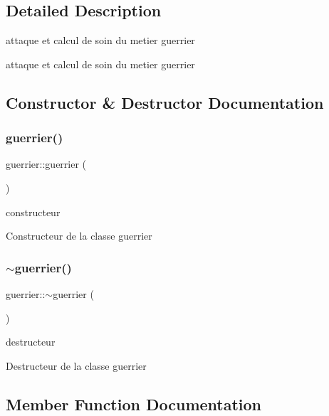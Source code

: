 \subsection{Detailed Description}
attaque et calcul de soin du metier guerrier 

attaque et calcul de soin du metier guerrier 

\subsection{Constructor \& Destructor Documentation}
\mbox{\label{classguerrier_ac9f4687d3fc741a5073144cc41ec3e2f}} 
\subsubsection{\texorpdfstring{guerrier()}{guerrier()}}
{\footnotesize\ttfamily guerrier\+::guerrier (\begin{DoxyParamCaption}{ }\end{DoxyParamCaption})}



constructeur 

Constructeur de la classe guerrier \mbox{\label{classguerrier_a32b49d2dd369765e82d4877eb77307d7}} 
\subsubsection{\texorpdfstring{$\sim$guerrier()}{~guerrier()}}
{\footnotesize\ttfamily guerrier\+::$\sim$guerrier (\begin{DoxyParamCaption}{ }\end{DoxyParamCaption})}



destructeur 

Destructeur de la classe guerrier 

\subsection{Member Function Documentation}
\mbox{\label{classguerrier_a45be17451300545249a90304dcd87fdc}} 
